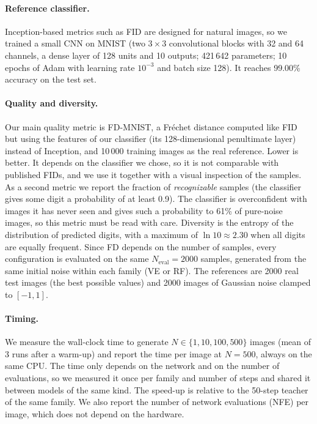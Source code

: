 \documentclass{article}
\begin{document}
\paragraph{Reference classifier.} Inception-based metrics such as FID are
designed for natural images, so we trained a small CNN on MNIST (two $3\times3$
convolutional blocks with 32 and 64 channels, a dense layer of 128 units and 10
outputs; 421\,642 parameters; 10 epochs of Adam with learning rate $10^{-3}$ and
batch size 128). It reaches 99.00\% accuracy on the test set.

\paragraph{Quality and diversity.} Our main quality metric is FD-MNIST, a
Fréchet distance computed like FID~\cite{heusel2017fid} but using the features of
our classifier (its 128-dimensional penultimate layer) instead of Inception, and
10\,000 training images as the real reference. Lower is better. It depends on
the classifier we chose, so it is not comparable with published FIDs, and we use
it together with a visual inspection of the samples. As a second metric we report
the fraction of \emph{recognizable} samples (the classifier gives some digit a
probability of at least 0.9). The classifier is overconfident with images it has
never seen and gives such a probability to 61\% of pure-noise images, so this
metric must be read with care. Diversity is the entropy of the distribution of
predicted digits, with a maximum of $\ln 10 \approx 2.30$ when all digits are
equally frequent. Since FD depends on the number of samples, every configuration
is evaluated on the same $N_\text{eval} = 2000$ samples, generated from the same
initial noise within each family (VE or RF). The references are 2000 real test
images (the best possible values) and 2000 images of Gaussian noise clamped to
$[-1, 1]$.

\paragraph{Timing.} We measure the wall-clock time to generate
$N \in \{1, 10, 100, 500\}$ images (mean of 3 runs after a warm-up) and report
the time per image at $N = 500$, always on the same CPU. The time only depends on
the network and on the number of evaluations, so we measured it once per family
and number of steps and shared it between models of the same kind. The speed-up
is relative to the 50-step teacher of the same family. We also report the number
of network evaluations (NFE) per image, which does not depend on the hardware.
\end{document}
